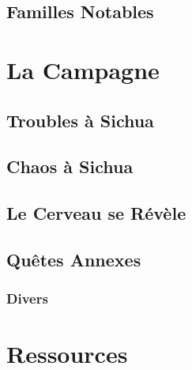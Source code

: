 \documentclass{dd}
\begin{document}










\chapter{Familles Notables}



\part{La Campagne}


\chapter{Troubles à Sichua}



\chapter{Chaos à Sichua}


\chapter{Le Cerveau se Révèle}


\chapter{Quêtes Annexes}



\section{Divers}



\part{Ressources}
\end{document}
